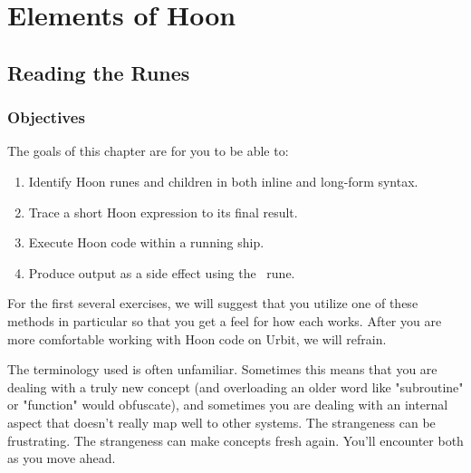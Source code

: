 \setchapterpreamble[u]{\margintoc}
\chapter{Elements of Hoon}


\section{Reading the Runes}

\subsection{Objectives}

The goals of this chapter are for you to be able to:

\begin{enumerate}
  \item  Identify Hoon runes and children in both inline and long-form syntax.
  \item  Trace a short Hoon expression to its final result.
  \item  Execute Hoon code within a running ship.
  \item  Produce output as a side effect using the \sigpam~rune.
\end{enumerate}


For the first several exercises, we will suggest that you utilize one of these methods in particular so that you get a feel for how each works.  After you are more comfortable working with Hoon code on Urbit, we will refrain.


The terminology used is often unfamiliar.  Sometimes this means that you are dealing with a truly new concept (and overloading an older word like "subroutine" or "function" would obfuscate), and sometimes you are dealing with an internal aspect that doesn't really map well to other systems.  The strangeness can be frustrating.  The strangeness can make concepts fresh again.  You'll encounter both as you move ahead.


